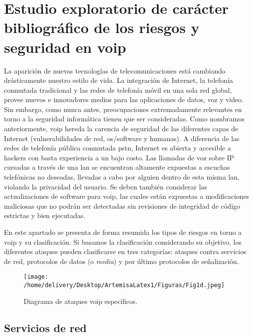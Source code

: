 \documentclass[a4paper,12pt]{report}
\begin{document}
\section{Estudio exploratorio de carácter bibliográfico de los riesgos y
seguridad en \ac{voip}}
\label{seguridad_voip}
La aparición de nuevas tecnologías de telecomunicaciones está cambiando
drásticamente nuestro estilo de vida. La integración de Internet, la telefonía
conmutada tradicional y las redes de telefonía móvil en una sola red global,
provee nuevos e innovadores medios para las aplicaciones de datos, voz y video.
Sin embargo, como nunca antes, preocupaciones extremadamente relevantes en
torno a la seguridad informática tienen que ser consideradas. Como nombramos
anteriormente, \ac{voip} hereda la carencia de seguridad de las diferentes capas de
Internet (vulnerabilidades de red, \ac{os}/software y
humanas). A diferencia de las redes de telefonía pública conmutada
\ac{pstn}, Internet es abierta y accesible a hackers con basta experiencia a
un bajo costo. Las llamadas de voz sobre IP cursadas a través de una \ac{lan} se
encuentran altamente expuestas a escuchas telefónicas no deseadas, llevadas
a cabo por alguien dentro de esta misma \ac{lan}, violando
la privacidad del usuario.  Se deben también considerar las actualizaciones de
software para \ac{voip}, las cuales están expuestas a modificaciones maliciosas que
no podrán ser detectadas sin revisiones de integridad de código estrictas y
bien ejecutadas.

En este apartado se presenta de forma resumida los tipos
de riesgos en torno a \ac{voip} y su clasificación. Si basamos la clasificación
considerando su objetivo, los diferentes ataques pueden clasificarse en tres
categorías: ataques contra servicios de red, protocolos de datos (o \emph{media}) y
por último protocolos de señalización.  

\begin{figure}[h!] 
\centering
\texttt{[image: /home/delivery/Desktop/ArtemisaLatex1/Figuras/Fig1d.jpeg]}
\caption{Diagrama de ataques \ac{voip} específicos. \cite{nassarm}}
\label{diagrama_ataques_voip}
\end{figure}

\subsection{Servicios de red}
\end{document}
